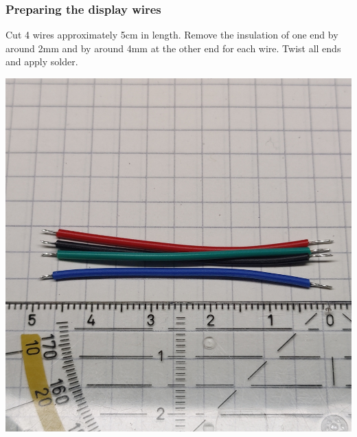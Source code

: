 \documentclass[]{article}
\begin{document}
\subsubsection{Preparing the display wires}
\begin{minipage}[t]{0.5\linewidth}
	\vspace{0pt}
	Cut 4 wires approximately 5cm in length. Remove the insulation of one end by around 2mm and by around 4mm at the other end for each wire. Twist all ends and apply solder.
\end{minipage}
\hfill
\begin{minipage}[t]{0.4\linewidth}
	\vspace{0pt}
	\includegraphics[width=\linewidth]{images/01_displayunit/02_wire_prepare.jpg}
\end{minipage}
\end{document}
